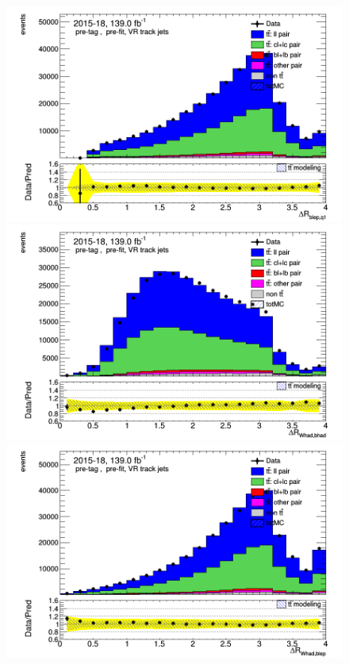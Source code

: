 \documentclass[letterpaper,12pt]{article}
\begin{document}
\begin{figure}
\begin{minipage}[b]{.45\textwidth}
\end{minipage}\hfill
\begin{minipage}[b]{.45\textwidth}
\centering
\includegraphics[width=1\textwidth]{Oct_distributions/pretagNoRwDL1rwithhighpTVRJets_scaledall/DataMC_dRblepq1.png} 
\end{minipage}\hfill
\begin{minipage}[b]{.45\textwidth}
\centering
\includegraphics[width=1\textwidth]{Oct_distributions/pretagNoRwDL1rwithhighpTVRJets_scaledall/DataMC_dRWhadbhad.png} 
\end{minipage}\hfill
\begin{minipage}[b]{.45\textwidth}
\centering
\includegraphics[width=1\textwidth]{Oct_distributions/pretagNoRwDL1rwithhighpTVRJets_scaledall/DataMC_dRWhadblep.png} 

\end{minipage}
\end{figure}
\end{document}
